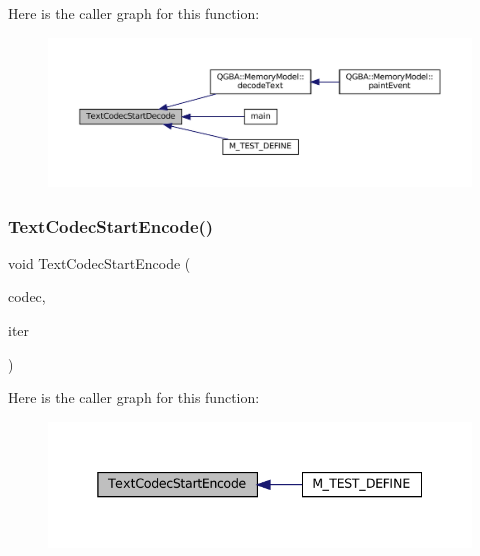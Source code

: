 Here is the caller graph for this function\+:
\nopagebreak
\begin{figure}[H]
\begin{center}
\leavevmode
\includegraphics[width=350pt]{text-codec_8c_a8a637ebd50ab6b36d4eb5a4c2a9bf55b_icgraph}
\end{center}
\end{figure}
\mbox{\label{text-codec_8c_a18c3e0575eb28af2d9eda669df015a74}} 
\subsubsection{\texorpdfstring{Text\+Codec\+Start\+Encode()}{TextCodecStartEncode()}}
{\footnotesize\ttfamily void Text\+Codec\+Start\+Encode (\begin{DoxyParamCaption}\item[{struct Text\+Codec $\ast$}]{codec,  }\item[{struct Text\+Codec\+Iterator $\ast$}]{iter }\end{DoxyParamCaption})}

Here is the caller graph for this function\+:
\nopagebreak
\begin{figure}[H]
\begin{center}
\leavevmode
\includegraphics[width=338pt]{text-codec_8c_a18c3e0575eb28af2d9eda669df015a74_icgraph}
\end{center}
\end{figure}
